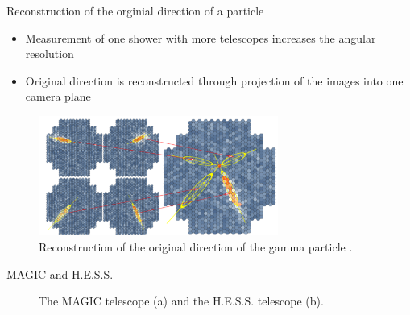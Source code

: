 \documentclass[aspectratio=1610, 10pt]{beamer}
\begin{document}
\begin{frame}{Reconstruction of the orginial direction of a particle}
  \begin{itemize}
    \item Measurement of one shower with more telescopes increases the angular resolution
    \medskip
    \item Original direction is reconstructed through projection of the images into one camera plane
  \end{itemize}
  \begin{figure}
    \includegraphics[width=0.7\textwidth]{images/reconstruction.png}
    \caption{Reconstruction of the original direction of the gamma particle \cite{iact}.}
  \end{figure}
\end{frame}

\begin{frame}{MAGIC and H.E.S.S.}
  \begin{figure}
      \hspace{0.5cm}
  \caption{ The MAGIC telescope (a) and the H.E.S.S. telescope (b).}
  \end{figure}
\end{frame}
\end{document}
